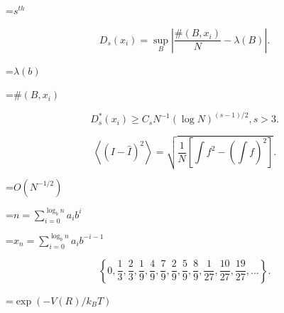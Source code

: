 {\newpage\clearpage\samepage
\setbox\sizebox=\hbox{$s^{th}$}\box\sizebox}\hbox{}\vfil

{\newpage\clearpage\samepage
\begin{equation}D_s ({ x}_i) = \sup_{B}
\left | \frac{ \# (B, { x}_i)}{N} - \lambda (B) \right | .
\label{EQN:Discrep}
\end{equation}}\hbox{}\vfil

{\newpage\clearpage\samepage
\setbox\sizebox=\hbox{$\lambda(b)$}\box\sizebox}\hbox{}\vfil

{\newpage\clearpage\samepage
\setbox\sizebox=\hbox{$\# (B, { x}_i)$}\box\sizebox}\hbox{}\vfil

{\newpage\clearpage\samepage
\begin{equation}D_s^* ({ x}_i) \ge C_s N^{-1} (\log N)^{(s-1)/2}, s > 3.
\label{EQN:Roth}
\end{equation}}\hbox{}\vfil

{\newpage\clearpage\samepage
\begin{equation}\left < ( I - \hat I )^2 \right > = \sqrt{ \frac{1}{N}
\left[ \int f^2 -(\int f)^2 \right]}.
\label{EQN:PRNbound}
\end{equation}}\hbox{}\vfil

{\newpage\clearpage\samepage
\setbox\sizebox=\hbox{$O(N^{-1/2})$}\box\sizebox}\hbox{}\vfil

{\newpage\clearpage\samepage
\setbox\sizebox=\hbox{$n=\sum_{i=0}^{\log_b n} a_i
b^i$}\box\sizebox}\hbox{}\vfil

{\newpage\clearpage\samepage
\setbox\sizebox=\hbox{$x_n = \sum_{i=0}^{\log_b n} a_i b^{-i-1}$}\box\sizebox}\hbox{}\vfil

{\newpage\clearpage\samepage
\begin{equation}\left \{ 0,
\frac{1}{3}, \frac{2}{3}, \frac{1}{9}, \frac{4}{9}, \frac{7}{9},
\frac{2}{9}, \frac{5}{9}, \frac{8}{9}, \frac{1}{27}, \frac{10}{27},
\frac{19}{27}, \dots 
\right \}.  
\end{equation}}\hbox{}\vfil

{\newpage\clearpage\samepage
\setbox\sizebox=\hbox{$\exp{(-V(R)/k_B T)}$}\box\sizebox}\hbox{}\vfil


\clearpage

